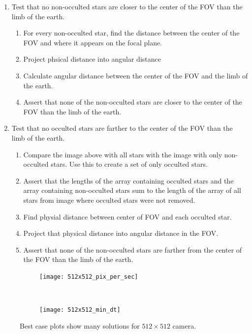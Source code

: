 \documentclass[]{DINOReportMemo}
\begin{document}
\begin{enumerate}
    \item Test that no non-occulted stars are closer to the center of the FOV than the limb of the earth.
    \begin{enumerate}
        \item For every non-occulted star, find the distance between the center of the FOV and where it appears on the focal plane.
        \item Project phsical distance into angular distance
        \item Calculate angular distance between the center of the FOV and the limb of the earth.
        \item Assert that none of the non-occulted stars are closer to the center of the FOV than the limb of the earth.
    \end{enumerate}
    \item Test that no occulted stars are farther to the center of the FOV than the limb of the earth.
    \begin{enumerate}
        \item Compare the image above with all stars with the image with only non-occulted stars. Use this to create a set of only occulted stars.
        \item Assert that the lengths of the array containing occulted stars and the array containing non-occulted stars sum to the length of the array of all stars from image where occulted stars were not removed.
        \item Find physial distance between center of FOV and each occulted star.
        \item Project that physical distance into angular distance in the FOV.
        \item Assert that none of the non-occulted stars are farther from the center of the FOV than the limb of the earth.
    \end{enumerate}

\end{enumerate}
\begin{figure}[t!]
    \centering
    \begin{subfigure}
        \centering
        \texttt{[image: 512x512\_pix\_per\_sec]}
    \end{subfigure}%
    ~ 
    \begin{subfigure}
        \centering
        \texttt{[image: 512x512\_min\_dt]}
    \end{subfigure}
    \caption{Best case plots show many solutions for $512\times512$ camera.}
    \label{512}
\end{figure}
\end{document}
